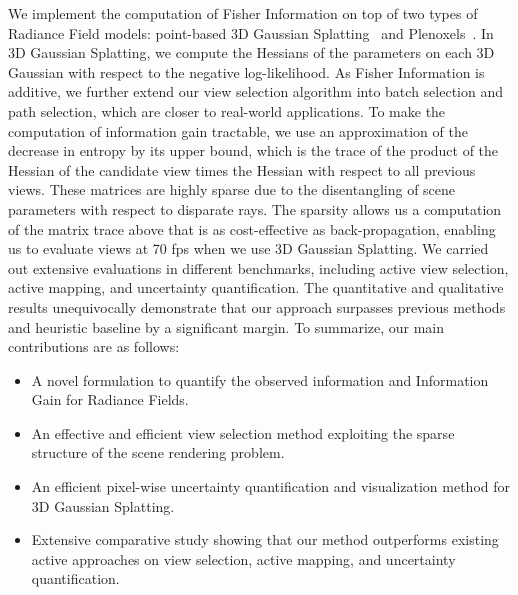 We implement the computation of Fisher Information on top of two types of Radiance Field models: point-based 3D Gaussian Splatting~\cite{kerbl3Dgaussians} and Plenoxels~\cite{plenoxels}. 
In 3D Gaussian Splatting, we compute the Hessians of the parameters on each 3D Gaussian with respect to the negative log-likelihood. 
As Fisher Information is additive, we further extend our view selection algorithm into batch selection and path selection, which are closer to real-world applications.
To make the computation of information gain tractable, we use an approximation of the decrease in entropy by its upper bound, which is the trace of the product of the Hessian of the candidate view times the Hessian with respect to all previous views. These matrices are highly sparse due to the disentangling of scene parameters with respect to disparate rays. The sparsity allows us a computation of the matrix trace above that is as cost-effective as back-propagation, enabling us to evaluate views at 70 fps when we use 3D Gaussian Splatting. 
We carried out extensive evaluations in different benchmarks, including active view selection, active mapping, and uncertainty quantification. 
The quantitative and qualitative results unequivocally demonstrate that our approach surpasses previous methods and heuristic baseline by a significant margin.
\noindent
To summarize, our main contributions are as follows:
\begin{itemize}
  \item A novel formulation to quantify the observed information and Information Gain for Radiance Fields.
  \item An effective and efficient view selection method exploiting the sparse structure of the scene rendering problem.
  \item An efficient pixel-wise uncertainty quantification and visualization method for 3D Gaussian Splatting.
  \item Extensive comparative study showing that our method outperforms existing active approaches on view selection, active mapping, and uncertainty quantification. 
\end{itemize}
